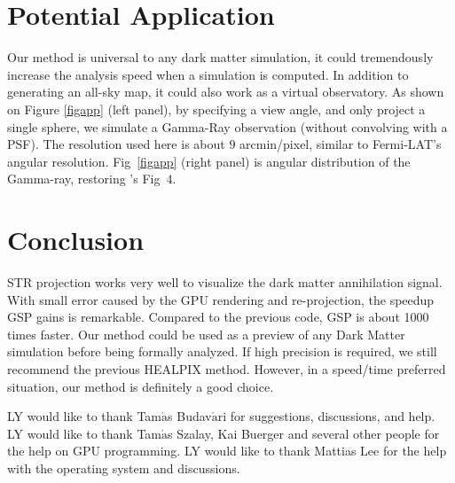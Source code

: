 \section{Potential Application}
Our method is universal to any dark matter simulation, it could tremendously increase the analysis speed when a simulation is computed. In addition to generating an all-sky map, it could also work as a virtual observatory. As shown on Figure \ref{figapp} (left panel), by specifying a view angle, and only project a single sphere, we simulate a Gamma-Ray observation (without convolving with a PSF). The resolution used here is about $9$ arcmin/pixel, similar to Fermi-LAT's angular resolution. Fig~\ref{figapp} (right panel) is angular distribution of the Gamma-ray, restoring \citet{Kuhlen:2008kr}'s Fig~4. 

\section{Conclusion}
STR projection works very well to visualize the dark matter annihilation signal. With small error caused by the GPU rendering and re-projection, the speedup GSP gains is remarkable. Compared to the previous code, GSP is about 1000 times faster. Our method could be used as a preview of any Dark Matter simulation before being formally analyzed. If high precision is required, we still recommend the previous HEALPIX method. However, in a speed/time preferred situation, our method is definitely a good choice. 

\acknowledgements LY would like to thank Tam$\mathrm{\acute{a}}$s Budav$\mathrm{\acute{a}}$ri for suggestions, discussions, and help. LY would like to thank Tam$\mathrm{\acute{a}}$s Szalay, Kai Buerger and several other people for the help on GPU programming. LY would like to thank Mattias Lee for the help with the operating system and discussions. 



